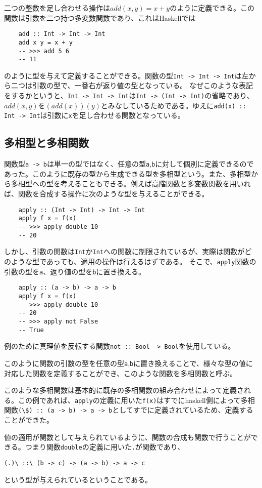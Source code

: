\documentclass[uplatex,dvipdfmx]{jsarticle}
\newcommand{\pr}[1]{\colorbox[rgb]{0.9,0.9,0.9}{\lstinline{#1}}}
\newcommand{\functype}[2]{\pr{#1 -> #2}}
\newcommand{\fpmor}[3]{\pr{#1 :: #2 -> #3}}
\begin{document}
  二つの整数を足し合わせる操作は$add(x,y)=x+y$のように定義できる。この関数は引数を二つ持つ多変数関数であり、これはHaskellでは
  \begin{lstlisting}
    add :: Int -> Int -> Int
    add x y = x + y
    -- >>> add 5 6
    -- 11
  \end{lstlisting}
  のように型を与えて定義することができる。関数の型\pr{Int -> Int -> Int}は左から二つは引数の型で、一番右が返り値の型となっている。
  なぜこのような表記をするかというと、\pr{Int -> Int -> Int}は\pr{Int -> (Int -> Int)}の省略であり、$add(x,y)$を$(add(x))(y)$とみなしているためである。ゆえに\fpmor{add(x)}{Int}{Int}は引数に\pr{x}を足し合わせる関数となっている。
  \subsection{多相型と多相関数}
  関数型\functype{a}{b}は単一の型ではなく、任意の型\pr{a},\pr{b}に対して個別に定義できるのであった。このように既存の型から生成できる型を多相型という。また、多相型から多相型への型を考えることもできる。例えば高階関数と多変数関数を用いれば、関数を合成する操作に次のような型を与えることができる。
  \begin{lstlisting}
    apply :: (Int -> Int) -> Int -> Int
    apply f x = f(x)
    -- >>> apply double 10
    -- 20
  \end{lstlisting}
  しかし、引数の関数は\pr{Int}か\pr{Int}への関数に制限されているが、実際は関数がどのような型であっても、適用の操作は行えるはずである。
  そこで、\pr{apply}関数の引数の型を\pr{a}、返り値の型を\pr{b}に置き換える。
    \begin{lstlisting}
    apply :: (a -> b) -> a -> b
    apply f x = f(x)
    -- >>> apply double 10
    -- 20
    -- >>> apply not False
    -- True
  \end{lstlisting}
  例のために真理値を反転する関数\fpmor{not}{Bool}{Bool}を使用している。
  
  このように関数の引数の型を任意の型\pr{a},\pr{b}に置き換えることで、様々な型の値に対応した関数を定義することができ、このような関数を多相関数と呼ぶ。

  このような多相関数は基本的に既存の多相関数の組み合わせによって定義される。この例であれば、\pr{apply}の定義に用いた\pr{f(x)}はすでにhaskell側によって多相関数\pr{(\$) :: (a -> b) -> a -> b}としてすでに定義されているため、定義することができた。

  値の適用が関数として与えられているように、関数の合成も関数で行うことができる。つまり関数\pr{double}の定義に用いた\pr{.}が関数であり、
  \begin{center}
    \pr{(.)\ ::\ (b -> c) -> (a -> b) -> a -> c}
  \end{center}
  という型が与えられているということである。
\end{document}
